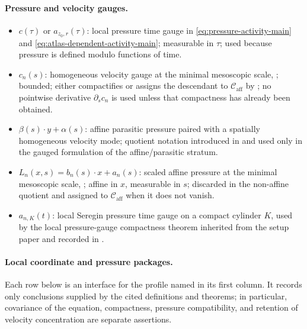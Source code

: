 \documentclass[11pt]{amsart}
\numberwithin{equation}{section}
\theoremstyle{plain}
\theoremstyle{definition}
\theoremstyle{remark}
\newcommand{\Caff}{\mathcal C_{\mathrm{aff}}}
\begin{document}
\paragraph{Pressure and velocity gauges.}
\begin{itemize}[leftmargin=1.6em]
   \item \(c(\tau)\) or \(a_{z_0,r}(\tau)\): local pressure time gauge in
      \eqref{eq:pressure-activity-main} and
      \eqref{eq:atlas-dependent-activity-main};
      measurable in \(\tau\); used because pressure is defined modulo functions
      of time.
   \item \(c_n(s)\): homogeneous velocity gauge at the minimal mesoscopic
      scale, ; bounded; either compactifies
      or assigns the descendant to \(\Caff\) by
      ; no pointwise derivative
      \(\partial_s c_n\) is used unless that compactness has already been
      obtained.
   \item \(\beta(s)\cdot y+\alpha(s)\): affine parasitic pressure paired with a
      spatially homogeneous velocity mode; quotient notation introduced in
       and used only in the gauged
      formulation of the affine/parasitic stratum.
   \item \(L_n(x,s)=b_n(s)\cdot x+a_n(s)\): scaled affine pressure at the
      minimal mesoscopic scale, ;
      affine in \(x\), measurable in \(s\); discarded in the non-affine quotient
      and assigned to \(\Caff\) when it does not vanish.
   \item \(a_{n,K}(t)\): local Seregin pressure time gauge on a compact
      cylinder \(K\), used by the local pressure-gauge compactness theorem
      inherited from the setup paper and recorded in
      .
\end{itemize}

\paragraph{Local coordinate and pressure packages.}
Each row below is an interface for the profile named in its first column.  It
records only conclusions supplied by the cited definitions and theorems; in
particular, covariance of the equation, compactness, pressure compatibility,
and retention of velocity concentration are separate assertions.
\end{document}
